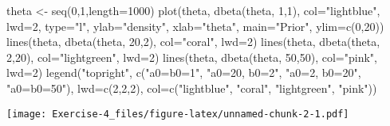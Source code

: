 \documentclass[
]{article}
\newenvironment{Shaded}{\begin{snugshade}}{\end{snugshade}}
\newcommand{\AttributeTok}[1]{\textcolor[rgb]{0.77,0.63,0.00}{#1}}
\newcommand{\DecValTok}[1]{\textcolor[rgb]{0.00,0.00,0.81}{#1}}
\newcommand{\FunctionTok}[1]{\textcolor[rgb]{0.00,0.00,0.00}{#1}}
\newcommand{\NormalTok}[1]{#1}
\newcommand{\OtherTok}[1]{\textcolor[rgb]{0.56,0.35,0.01}{#1}}
\newcommand{\StringTok}[1]{\textcolor[rgb]{0.31,0.60,0.02}{#1}}
\begin{document}
\begin{Shaded}
\begin{Highlighting}[]
\NormalTok{theta }\OtherTok{\textless{}{-}} \FunctionTok{seq}\NormalTok{(}\DecValTok{0}\NormalTok{,}\DecValTok{1}\NormalTok{,}\AttributeTok{length=}\DecValTok{1000}\NormalTok{)}
\FunctionTok{plot}\NormalTok{(theta, }\FunctionTok{dbeta}\NormalTok{(theta, }\DecValTok{1}\NormalTok{,}\DecValTok{1}\NormalTok{), }\AttributeTok{col=}\StringTok{"lightblue"}\NormalTok{, }\AttributeTok{lwd=}\DecValTok{2}\NormalTok{,}
\AttributeTok{type=}\StringTok{"l"}\NormalTok{, }\AttributeTok{ylab=}\StringTok{"density"}\NormalTok{, }\AttributeTok{xlab=}\StringTok{"theta"}\NormalTok{, }\AttributeTok{main=}\StringTok{"Prior"}\NormalTok{, }\AttributeTok{ylim=}\FunctionTok{c}\NormalTok{(}\DecValTok{0}\NormalTok{,}\DecValTok{20}\NormalTok{))}
\FunctionTok{lines}\NormalTok{(theta, }\FunctionTok{dbeta}\NormalTok{(theta, }\DecValTok{20}\NormalTok{,}\DecValTok{2}\NormalTok{), }\AttributeTok{col=}\StringTok{"coral"}\NormalTok{, }\AttributeTok{lwd=}\DecValTok{2}\NormalTok{)}
\FunctionTok{lines}\NormalTok{(theta, }\FunctionTok{dbeta}\NormalTok{(theta, }\DecValTok{2}\NormalTok{,}\DecValTok{20}\NormalTok{), }\AttributeTok{col=}\StringTok{"lightgreen"}\NormalTok{, }\AttributeTok{lwd=}\DecValTok{2}\NormalTok{)}
\FunctionTok{lines}\NormalTok{(theta, }\FunctionTok{dbeta}\NormalTok{(theta, }\DecValTok{50}\NormalTok{,}\DecValTok{50}\NormalTok{), }\AttributeTok{col=}\StringTok{"pink"}\NormalTok{, }\AttributeTok{lwd=}\DecValTok{2}\NormalTok{)}
\FunctionTok{legend}\NormalTok{(}\StringTok{"topright"}\NormalTok{, }\FunctionTok{c}\NormalTok{(}\StringTok{"a0=b0=1"}\NormalTok{, }\StringTok{"a0=20, b0=2"}\NormalTok{, }\StringTok{"a0=2, b0=20"}\NormalTok{, }\StringTok{"a0=b0=50"}\NormalTok{),}
\AttributeTok{lwd=}\FunctionTok{c}\NormalTok{(}\DecValTok{2}\NormalTok{,}\DecValTok{2}\NormalTok{,}\DecValTok{2}\NormalTok{), }\AttributeTok{col=}\FunctionTok{c}\NormalTok{(}\StringTok{"lightblue"}\NormalTok{, }\StringTok{"coral"}\NormalTok{, }\StringTok{"lightgreen"}\NormalTok{, }\StringTok{"pink"}\NormalTok{))}
\end{Highlighting}
\end{Shaded}

\texttt{[image: Exercise-4\_files/figure-latex/unnamed-chunk-2-1.pdf]}
\end{document}
